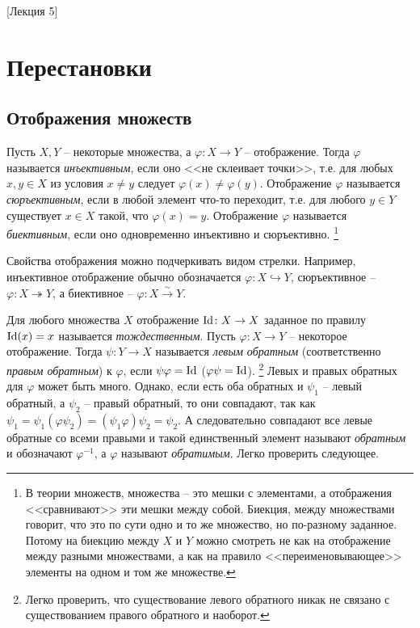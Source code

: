 [Лекция 5]


\newpage

\section{Перестановки}

\subsection{Отображения множеств}

Пусть $X,Y$ -- некоторые множества, а $\varphi\colon X\to Y$ -- отображение.
Тогда $\varphi$ называется {\it инъективным}, если оно <<не склеивает точки>>, т.е. для любых $x,y\in X$ из условия $x\neq y$ следует $\varphi(x)\neq\varphi(y)$.
Отображение $\varphi$ называется {\it сюръективным}, если в любой элемент что-то переходит, т.е. для любого $y\in Y$ существует $x\in X$ такой, что $\varphi(x)=y$.
Отображение $\varphi$ называется {\it биективным}, если оно одновременно инъективно и сюръективно.%
\footnote{В теории множеств, множества -- это мешки с элементами, а отображения <<сравнивают>> эти мешки между собой.
Биекция, между множествами говорит, что это по сути одно и то же множество, но по-разному заданное.
Потому на биекцию между $X$ и $Y$ можно смотреть не как на отображение между разными множествами, а как на правило <<переименовывающее>> элементы на одном и том же множестве.}

Свойства отображения можно подчеркивать видом стрелки.
Например, инъективное отображение обычно обозначается $\varphi\colon X\hookrightarrow Y$, сюръективное -- $\varphi\colon X\twoheadrightarrow Y$, а биективное --  $\varphi\colon X\stackrel{\sim}{\longrightarrow}Y$.

Для любого множества $X$ отображение $\operatorname{Id}\colon X\to X$ заданное по правилу $\operatorname{Id}(x) = x$ называется {\it тождественным}.
Пусть $\varphi\colon X\to Y$ -- некоторое отображение.
Тогда $\psi\colon Y\to X$ называется {\it левым обратным} (соответственно {\it правым обратным}) к $\varphi$, если $\psi\varphi = \operatorname{Id}$ ($\varphi\psi = \operatorname{Id}$).%
\footnote{Легко проверить, что существование левого обратного никак не связано с существованием правого обратного и наоборот.}
Левых и правых обратных для $\varphi$ может быть много.
Однако, если есть оба обратных и $\psi_1$ -- левый обратный, а $\psi_2$ -- правый обратный, то они совпадают, так как $\psi_1 = \psi_1 (\varphi \psi_2) = (\psi_1\varphi)\psi_2 = \psi_2$.
А следовательно совпадают все левые обратные со всеми правыми и такой единственный элемент называют {\it обратным} и обозначают $\varphi^{-1}$, а $\varphi$ называют {\it обратимым}.
Легко проверить следующее.

